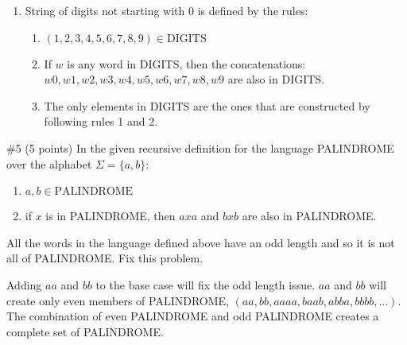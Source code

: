 \begin{solution}
\begin{enumerate}[label=\alph*)]
        \item String of digits not starting with 0 is defined by the rules:
        \begin{enumerate}[label=\arabic*]
            \item \((1,2,3,4,5,6,7,8,9) \in \text{DIGITS}\)
            \item If \(w\) is any word in DIGITS, then the concatenations:\\\(w0,w1,w2,w3,w4,w5,w6,w7,w8,w9\) are also in DIGITS.
            \item The only elements in DIGITS are the ones that are constructed by following rules 1 and 2.
        \end{enumerate}
    \end{enumerate}
\end{solution}

\begin{problem}{\#5 (5 points)}
    In the given recursive definition for the language PALINDROME over the alphabet \(\Sigma = \{a,b\}\):
    \begin{enumerate}
        \item \(a, b \in \text{PALINDROME}\)
        \item if \(x\) is in PALINDROME, then \(axa\) and \(bxb\) are also in PALINDROME.
    \end{enumerate}
    All the words in the language defined above have an odd length and so it is not all of PALINDROME.
    Fix this problem.
\end{problem}
\vspace{2em}
\begin{solution}
    Adding \(aa\) and \(bb\) to the base case will fix the odd length issue.
    \(aa\) and \(bb\) will create only even members of PALINDROME, \((aa,bb,aaaa,baab,abba,bbbb,\ldots)\).
    The combination of even PALINDROME and odd PALINDROME creates a complete set of PALINDROME. 
\end{solution}